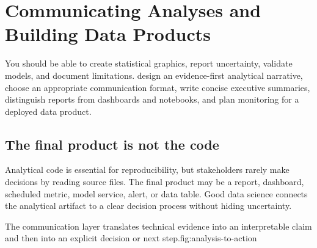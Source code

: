 \chapter{Communicating Analyses and Building Data Products}
\label{chap:communication}
\chapterguide
  {You should be able to create statistical graphics, report uncertainty, validate models, and document limitations.}
  {design an evidence-first analytical narrative, choose an appropriate communication format, write concise executive summaries, distinguish reports from dashboards and notebooks, and plan monitoring for a deployed data product.}

\section{The final product is not the code}
Analytical code is essential for reproducibility, but stakeholders rarely make decisions by reading source files. The final product may be a report, dashboard, scheduled metric, model service, alert, or data table. Good data science connects the analytical artifact to a clear decision process without hiding uncertainty.

\begin{utpfig}{The communication layer translates technical evidence into an interpretable claim and then into an explicit decision or next step.}{fig:analysis-to-action}
\end{utpfig}

